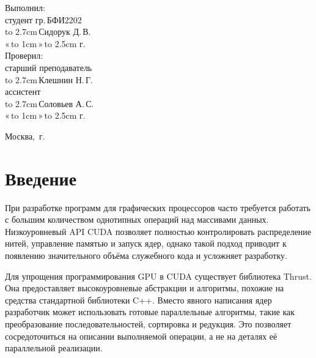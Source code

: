 \documentclass[14pt]{extarticle}
\makeatletter
\newcommand{\hrf}[1]{\hbox to #1{\hrulefill}} %
\newcounter{sectionc} %
\newcommand{\numbersections}{\renewcommand{\Hy@numberline}[1]{##1~}}
\newcommand{\nonumbersections}{\renewcommand{\Hy@numberline}[1]{}}
\let\oldsection\section
\renewcommand{\section}{\numbersections\oldsection}
\let\oldsectionc\sectionc
\renewcommand{\sectionc}{\nonumbersections\oldsectionc}
\renewcommand\tableofcontents{
	\pdfbookmark[sectionc]{\contentsname}{toc} %
	\sectionc*{\contentsname
		\@mkboth{\contentsname}{\contentsname}}
	\@starttoc{toc}
}
\makeatother
\begin{document}
\vfill %

\hfill %
\begin{minipage}{0.45\textwidth} %
	Выполнил:\\[2mm]
	студент гр.\,БФИ2202\\[2mm]
	\hrf{2.7cm}\,Сидорук Д.\,В.\\[2mm]
	«\,\hrf{1cm}\,»\,\hrf{2.5cm}\,\the\year{}\,г.\\[5mm]
	
	Проверил:\\[2mm]
	старший преподаватель\\[2mm]
	\hrf{2.7cm}\,Клешнин Н.\,Г.\\[2mm]
	ассистент\\[2mm]
	\hrf{2.7cm}\,Соловьев А.\,С.\\[2mm]
	«\,\hrf{1cm}\,»\,\hrf{2.5cm}\,\the\year{}\,г.
\end{minipage}%

\vfill

\centerline{Москва, \the\year{}\,г.} %
\thispagestyle{empty} %
\newpage %
\tableofcontents %
\newpage %

\section{Введение}

При разработке программ для графических процессоров часто требуется работать с большим количеством однотипных операций над массивами данных. Низкоуровневый API CUDA позволяет полностью контролировать распределение нитей, управление памятью и запуск ядер, однако такой подход приводит к появлению значительного объёма служебного кода и усложняет разработку.

Для упрощения программирования GPU в CUDA существует библиотека Thrust. Она предоставляет высокоуровневые абстракции и алгоритмы, похожие на средства стандартной библиотеки C++. Вместо явного написания ядер разработчик может использовать готовые параллельные алгоритмы, такие как преобразование последовательностей, сортировка и редукция. Это позволяет сосредоточиться на описании выполняемой операции, а не на деталях её параллельной реализации.
\end{document}
